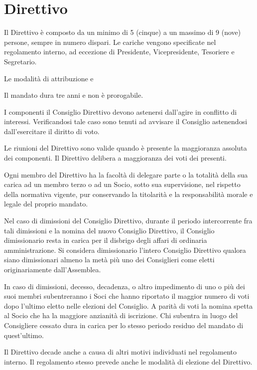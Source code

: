 \documentclass[legalpaper, 11pt]{exam}
\let\tempone\enumerate
\let\temptwo\endenumerate
\renewenvironment{enumerate}{\tempone\addtolength{\itemsep}{-0.45\baselineskip}}{\temptwo}
\begin{document}
{\section{Direttivo}
\begin{enumerate}
 \item Il Direttivo è composto da un minimo di 5 (cinque) a un massimo di 9 (nove) persone, sempre in numero dispari. Le cariche vengono specificate nel regolamento interno, ad eccezione di Presidente, Vicepresidente, Tesoriere e Segretario.
 \item %
 \item Le modalità di attribuzione e 
 \item Il mandato dura tre anni e non è prorogabile.
 \item I componenti il Consiglio Direttivo devono astenersi dall’agire in conflitto di interessi. Verificandosi tale caso sono tenuti ad avvisare il Consiglio astenendosi dall’esercitare il diritto di voto.
 \item Le riunioni del Direttivo sono valide quando è presente la maggioranza assoluta dei componenti. Il Direttivo delibera a maggioranza dei voti dei presenti.
 \item Ogni membro del Direttivo ha la facoltà di delegare parte o la totalità della sua carica ad un membro terzo o ad un Socio, sotto sua supervisione, nel rispetto della normativa vigente, pur conservando la titolarità e la responsabilità morale e legale del proprio mandato.
 \item Nel caso di dimissioni del Consiglio Direttivo, durante il periodo intercorrente fra tali dimissioni e la nomina del nuovo Consiglio Direttivo, il Consiglio dimissionario resta in carica per il disbrigo degli affari di ordinaria amministrazione. Si considera dimissionario l’intero Consiglio Direttivo qualora siano dimissionari almeno la metà più uno dei Consiglieri come eletti originariamente dall’Assemblea.
 \item In caso di dimissioni, decesso, decadenza, o altro impedimento di uno o più dei suoi membri subentreranno i Soci che hanno riportato il maggior numero di voti dopo l’ultimo eletto nelle elezioni del Consiglio. A parità di voti la nomina spetta al Socio che ha la maggiore anzianità di iscrizione. Chi subentra in luogo del Consigliere cessato dura in carica per lo stesso periodo residuo del mandato di quest'ultimo.
 \item Il Direttivo decade anche a causa di altri motivi individuati nel regolamento interno. Il regolamento stesso prevede anche le modalità di elezione del Direttivo.
\end{enumerate}

}
\end{document}
